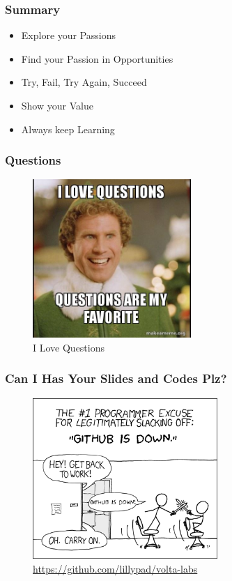 \documentclass[aspectratio=169]{beamer}
\begin{document}
\begin{frame}
  \frametitle{Summary}
  \begin{itemize}
  \item{Explore your Passions}
  \item{Find your Passion in Opportunities}
  \item{Try, Fail, Try Again, Succeed}
  \item{Show your Value}
  \item{Always keep Learning}
  \end{itemize}
\end{frame}

\begin{frame}
  \frametitle{Questions}
  \begin{center}
    \begin{figure}
      \includegraphics[width=6cm,keepaspectratio]{questions_meme}
      \caption{I Love Questions}
    \end{figure}
  \end{center}
\end{frame}

\begin{frame}
  \frametitle{Can I Has Your Slides and Codes Plz?}
  \begin{center}
    \begin{figure}
      \includegraphics[width=7cm,keepaspectratio]{git_meme}
      \caption{\href{https://github.com/lillypad/nscc-tech-connect}{https://github.com/lillypad/volta-labs}}
    \end{figure}
  \end{center}
\end{frame}
\end{document}
